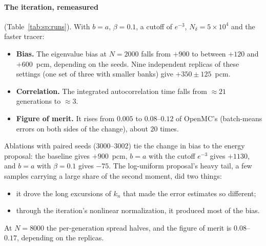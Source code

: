 \paragraph{The iteration, remeasured} (Table~\ref{tab:sp:runs}). With $b=a$, $\beta=0.1$, a cutoff of
$e^{-3}$, $N_\delta=5\times10^4$ and the faster tracer:
\begin{itemize}
\item \textbf{Bias.} The eigenvalue bias at $N=2000$ falls from $+900$ to between $+120$ and
  $+600$~pcm, depending on the seeds. Nine independent replicas of these settings (one set of three with smaller banks) give
  $+350\pm125$~pcm.
\item \textbf{Correlation.} The integrated autocorrelation time falls from $\approx21$ generations to
  $\approx3$.
\item \textbf{Figure of merit.} It rises from $0.005$ to $0.08$--$0.12$ of OpenMC's (batch-means
  errors on both sides of the change), about $20$ times.
\end{itemize}

Ablations with paired seeds (3000--3002) tie the change in bias to the energy proposal: the baseline
gives $+900$~pcm, $b=a$ with the cutoff $e^{-3}$ gives $+1130$, and $b=a$ with $\beta=0.1$ gives $-75$. The log-uniform proposal's
heavy tail, a few samples carrying a large share of the second moment, did two things:
\begin{itemize}
\item it drove the long excursions of $k_n$ that made the error estimates so different;
\item through the iteration's nonlinear normalization, it produced most of the bias.
\end{itemize}

At $N=8000$ the per-generation spread halves, and the figure of merit is $0.08$--$0.17$, depending on
the replicas.

